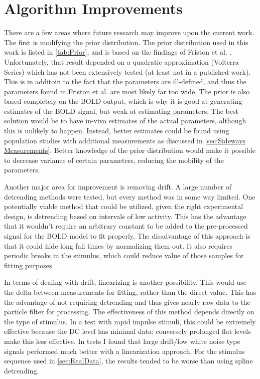 \section{Algorithm Improvements}
\label{sec:Particle Filter Variations}
There are a few areas where future research may improve upon the current
work. The first is modifying the prior 
distribution. The prior distribution used in this work is listed in \autoref{tab:Prior}, 
and is based on the findings of Friston et al. \cite{Friston2000}. Unfortunately, that
result depended on a quadratic approximation (Volterra Series) which has
not been extensively tested (at least not in a published work). 
This is in additoin to the fact that the parameters are ill-defined, and
thus the parameters found in Friston et al. are most likely far too wide.
The prior is also
based completely on the BOLD output, which is why it is good at generating
estimates of the BOLD signal, but weak at estimating parameters. 
The best solution would be to have
in-vivo estimates of the actual parameters, although this
is unlikely to happen. Instead, better estimates could be found
using population studies with additional measurements as discussed in 
\autoref{sec:Sideways Measurements}. Better knowledge of the prior distribution
would make it possible to decrease variance of certain 
parameters, reducing the mobility of the parameters.

Another major area for improvement is removing drift. 
A large number of detrending methods were tested, but every method was in some way limited. 
One potentially viable method that could be utilized, given the right 
experimental design, is detrending based on intervals of low activity. This 
has the advantage that it wouldn't require an arbitrary
constant to be added to the pre-processed signal for the
BOLD model to fit properly.  The disadvantage of this approach is 
that it could hide long fall times by normalizing them
out. It also requires periodic breaks in the stimulus, 
which could reduce value of those samples for fitting purposes. 

In terms of dealing with drift, linearizing is another possibility.
This would use the delta between measurements for fitting, rather than the 
direct value. This has the advantage of not requiring detrending and thus 
gives nearly raw data to the particle filter for processing. 
The effectiveness of this method depends directly on the type of stimulus.
In a test with rapid impulse stimuli, this could be extremely effective because
the DC level has minimal data; conversely prolonged flat levels make this less effective.
In tests I found that large drift/low white noise
type signals performed much better with a linearization approach.
For the stimulus sequence used in \autoref{sec:RealData}, the results tended to be worse
than using spline detrending.

